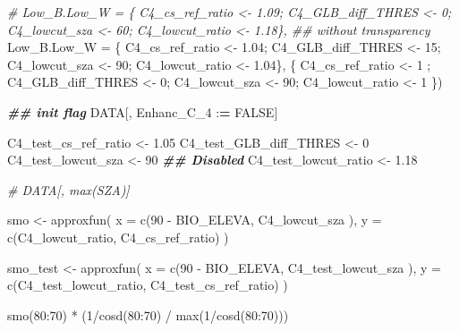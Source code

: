 \documentclass[
  10pt,
  a4paper,oneside]{article}
\newenvironment{Shaded}{\begin{snugshade}}{\end{snugshade}}
\newcommand{\AttributeTok}[1]{\textcolor[rgb]{0.77,0.63,0.00}{#1}}
\newcommand{\CommentTok}[1]{\textcolor[rgb]{0.56,0.35,0.01}{\textit{#1}}}
\newcommand{\ConstantTok}[1]{\textcolor[rgb]{0.00,0.00,0.00}{#1}}
\newcommand{\DecValTok}[1]{\textcolor[rgb]{0.00,0.00,0.81}{#1}}
\newcommand{\DocumentationTok}[1]{\textcolor[rgb]{0.56,0.35,0.01}{\textbf{\textit{#1}}}}
\newcommand{\ErrorTok}[1]{\textcolor[rgb]{0.64,0.00,0.00}{\textbf{#1}}}
\newcommand{\FloatTok}[1]{\textcolor[rgb]{0.00,0.00,0.81}{#1}}
\newcommand{\FunctionTok}[1]{\textcolor[rgb]{0.00,0.00,0.00}{#1}}
\newcommand{\NormalTok}[1]{#1}
\newcommand{\OtherTok}[1]{\textcolor[rgb]{0.56,0.35,0.01}{#1}}
\newcommand{\SpecialCharTok}[1]{\textcolor[rgb]{0.00,0.00,0.00}{#1}}
\begin{document}
\begin{Shaded}
\begin{Highlighting}[]
       \CommentTok{\# Low\_B.Low\_W     = \{ C4\_cs\_ref\_ratio \textless{}{-} 1.09; C4\_GLB\_diff\_THRES \textless{}{-}  0; C4\_lowcut\_sza \textless{}{-} 60; C4\_lowcut\_ratio \textless{}{-} 1.18\}, \#\# without transparency}
       \AttributeTok{Low\_B.Low\_W     =}\NormalTok{ \{ C4\_cs\_ref\_ratio }\OtherTok{\textless{}{-}} \FloatTok{1.04}\NormalTok{; C4\_GLB\_diff\_THRES }\OtherTok{\textless{}{-}} \DecValTok{15}\NormalTok{; C4\_lowcut\_sza }\OtherTok{\textless{}{-}} \DecValTok{90}\NormalTok{; C4\_lowcut\_ratio }\OtherTok{\textless{}{-}} \FloatTok{1.04}\NormalTok{\},}
\NormalTok{                         \{ C4\_cs\_ref\_ratio }\OtherTok{\textless{}{-}} \DecValTok{1}\NormalTok{   ; C4\_GLB\_diff\_THRES }\OtherTok{\textless{}{-}}  \DecValTok{0}\NormalTok{; C4\_lowcut\_sza }\OtherTok{\textless{}{-}} \DecValTok{90}\NormalTok{; C4\_lowcut\_ratio }\OtherTok{\textless{}{-}} \DecValTok{1}\NormalTok{   \})}


\DocumentationTok{\#\# init flag}
\NormalTok{DATA[, Enhanc\_C\_4 }\SpecialCharTok{:}\ErrorTok{=} \ConstantTok{FALSE}\NormalTok{]}

\NormalTok{C4\_test\_cs\_ref\_ratio   }\OtherTok{\textless{}{-}}  \FloatTok{1.05}
\NormalTok{C4\_test\_GLB\_diff\_THRES }\OtherTok{\textless{}{-}}  \DecValTok{0}
\NormalTok{C4\_test\_lowcut\_sza     }\OtherTok{\textless{}{-}} \DecValTok{90}  \DocumentationTok{\#\# Disabled}
\NormalTok{C4\_test\_lowcut\_ratio   }\OtherTok{\textless{}{-}}  \FloatTok{1.18}

\CommentTok{\# DATA[, max(SZA)]}

\NormalTok{smo }\OtherTok{\textless{}{-}} \FunctionTok{approxfun}\NormalTok{(}
  \AttributeTok{x =} \FunctionTok{c}\NormalTok{(}\DecValTok{90} \SpecialCharTok{{-}}\NormalTok{ BIO\_ELEVA,  C4\_lowcut\_sza  ),}
  \AttributeTok{y =} \FunctionTok{c}\NormalTok{(C4\_lowcut\_ratio, C4\_cs\_ref\_ratio)}
\NormalTok{)}

\NormalTok{smo\_test }\OtherTok{\textless{}{-}} \FunctionTok{approxfun}\NormalTok{(}
  \AttributeTok{x =} \FunctionTok{c}\NormalTok{(}\DecValTok{90} \SpecialCharTok{{-}}\NormalTok{ BIO\_ELEVA,       C4\_test\_lowcut\_sza  ),}
  \AttributeTok{y =} \FunctionTok{c}\NormalTok{(C4\_test\_lowcut\_ratio, C4\_test\_cs\_ref\_ratio)}
\NormalTok{)}

\FunctionTok{smo}\NormalTok{(}\DecValTok{80}\SpecialCharTok{:}\DecValTok{70}\NormalTok{) }\SpecialCharTok{*}\NormalTok{ (}\DecValTok{1}\SpecialCharTok{/}\FunctionTok{cosd}\NormalTok{(}\DecValTok{80}\SpecialCharTok{:}\DecValTok{70}\NormalTok{) }\SpecialCharTok{/} \FunctionTok{max}\NormalTok{(}\DecValTok{1}\SpecialCharTok{/}\FunctionTok{cosd}\NormalTok{(}\DecValTok{80}\SpecialCharTok{:}\DecValTok{70}\NormalTok{)))}
\end{Highlighting}
\end{Shaded}
\end{document}
